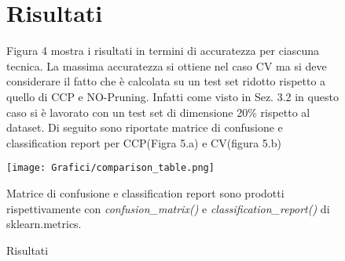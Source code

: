 \documentclass[]{article}
\begin{document}
\begin{figure}
\section{Risultati }
Figura 4 mostra i risultati in termini di accuratezza per ciascuna tecnica.
La massima accuratezza si ottiene nel caso CV ma si deve considerare il fatto che è calcolata su un test set ridotto rispetto a quello di CCP e NO-Pruning. Infatti come visto in Sez. 3.2 in questo caso si è lavorato con un test set di dimensione 20\% rispetto al dataset.
Di seguito sono riportate matrice di confusione e classification report per CCP(Figra 5.a) e CV(figura 5.b)
\\
\begin{center}
\texttt{[image: Grafici/comparison\_table.png]} 

\caption{Risultati}
\end{center}
Matrice di confusione e classification report sono prodotti rispettivamente con \textit{confusion\_matrix()} e \textit{classification\_report()} di sklearn.metrics.
\end{figure}
\end{document}
